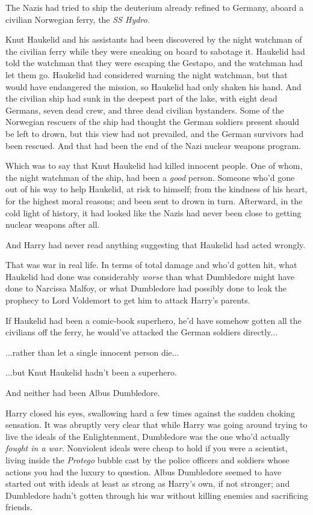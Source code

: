 The Nazis had tried to ship the deuterium already refined to Germany,
aboard a civilian Norwegian ferry, the \emph{SS Hydro.}

Knut Haukelid and his assistants had been discovered by the night
watchman of the civilian ferry while they were sneaking on board to
sabotage it. Haukelid had told the watchman that they were escaping the
Gestapo, and the watchman had let them go. Haukelid had considered
warning the night watchman, but that would have endangered the mission,
so Haukelid had only shaken his hand. And the civilian ship had sunk in
the deepest part of the lake, with eight dead Germans, seven dead crew,
and three dead civilian bystanders. Some of the Norwegian rescuers of
the ship had thought the German soldiers present should be left to
drown, but this view had not prevailed, and the German survivors had
been rescued. And that had been the end of the Nazi nuclear weapons
program.

Which was to say that Knut Haukelid had killed innocent people. One of
whom, the night watchman of the ship, had been a \emph{good} person.
Someone who'd gone out of his way to help Haukelid, at risk to himself;
from the kindness of his heart, for the highest moral reasons; and been
sent to drown in turn. Afterward, in the cold light of history, it had
looked like the Nazis had never been close to getting nuclear weapons
after all.

And Harry had never read anything suggesting that Haukelid had acted
wrongly.

That was war in real life. In terms of total damage and who'd gotten
hit, what Haukelid had done was considerably \emph{worse} than what
Dumbledore might have done to Narcissa Malfoy, or what Dumbledore had
possibly done to leak the prophecy to Lord Voldemort to get him to
attack Harry's parents.

If Haukelid had been a comic-book superhero, he'd have somehow gotten
all the civilians off the ferry, he would've attacked the German
soldiers directly...

...rather than let a single innocent person die...

...but Knut Haukelid hadn't been a superhero.

And neither had been Albus Dumbledore.

Harry closed his eyes, swallowing hard a few times against the sudden
choking sensation. It was abruptly very clear that while Harry was going
around trying to live the ideals of the Enlightenment, Dumbledore was
the one who'd actually \emph{fought in a war}. Nonviolent ideals were
cheap to hold if you were a scientist, living inside the \emph{Protego}
bubble cast by the police officers and soldiers whose actions you had
the luxury to question. Albus Dumbledore seemed to have started out with
ideals at least as strong as Harry's own, if not stronger; and
Dumbledore hadn't gotten through his war without killing enemies and
sacrificing friends.

